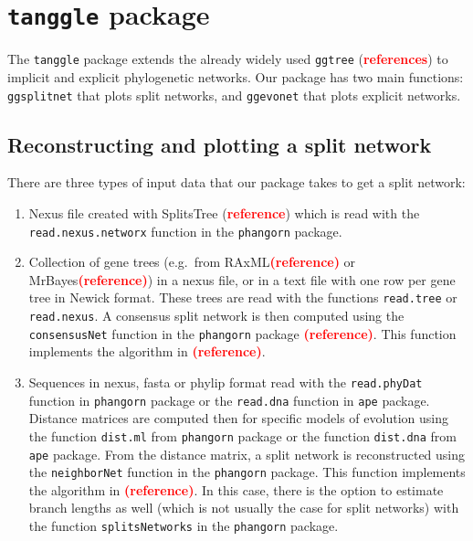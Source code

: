 \documentclass[]{article}
\providecommand{\tightlist}{%
  \setlength{\itemsep}{0pt}\setlength{\parskip}{0pt}}
\begin{document}
\hypertarget{tanggle-package}{%
\section{\texorpdfstring{\texttt{tanggle}
package}{tanggle package}}\label{tanggle-package}}

The \texttt{tanggle} package extends the already widely used
\texttt{ggtree} (\textcolor{red}{\textbf{references}}) to implicit and
explicit phylogenetic networks. Our package has two main functions:
\texttt{ggsplitnet} that plots split networks, and \texttt{ggevonet}
that plots explicit networks.

\vspace{-0.25cm}

\hypertarget{reconstructing-and-plotting-a-split-network}{%
\subsection{Reconstructing and plotting a split
network}\label{reconstructing-and-plotting-a-split-network}}

There are three types of input data that our package takes to get a
split network:

\begin{enumerate}
\def\labelenumi{\arabic{enumi}.}
\tightlist
\item
  Nexus file created with SplitsTree
  (\textcolor{red}{\textbf{reference}}) which is read with the
  \texttt{read.nexus.networx} function in the \texttt{phangorn} package.
\item
  Collection of gene trees (e.g.~from
  RAxML\textcolor{red}{\textbf{(reference)}} or
  MrBayes\textcolor{red}{\textbf{(reference)}}) in a nexus file, or in a
  text file with one row per gene tree in Newick format. These trees are
  read with the functions \texttt{read.tree} or \texttt{read.nexus}. A
  consensus split network is then computed using the
  \texttt{consensusNet} function in the \texttt{phangorn} package
  \textcolor{red}{\textbf{(reference)}}. This function implements the
  algorithm in \textcolor{red}{\textbf{(reference)}}.
\item
  Sequences in nexus, fasta or phylip format read with the
  \texttt{read.phyDat} function in \texttt{phangorn} package or the
  \texttt{read.dna} function in \texttt{ape} package. Distance matrices
  are computed then for specific models of evolution using the function
  \texttt{dist.ml} from \texttt{phangorn} package or the function
  \texttt{dist.dna} from \texttt{ape} package. From the distance matrix,
  a split network is reconstructed using the \texttt{neighborNet}
  function in the \texttt{phangorn} package. This function implements
  the algorithm in \textcolor{red}{\textbf{(reference)}}. In this case,
  there is the option to estimate branch lengths as well (which is not
  usually the case for split networks) with the function
  \texttt{splitsNetworks} in the \texttt{phangorn} package.
\end{enumerate}
\end{document}
